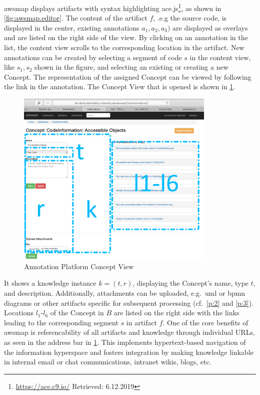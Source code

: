 \gls{awsmap} displays artifacts with syntax highlighting ace.js\footnote{\url{https://ace.c9.io/} Retrieved: 6.12.2019}, as shown in \cref{fig:awsmap.editor}.
The content of the artifact \(f\), .e.g the source code, is displayed in the center,
existing annotations \(a_1, a_2, a_3)\) are displayed as overlays and are listed on the right side of the view.
By clicking on an annotation in the list, the content view scrolls to the corresponding location in the artifact.
New annotations can be created by selecting a segment of code \(s\) in the content view, like \(s_1, s_2\) shown in the figure, and selecting an existing or creating a new \gls{Concept}.
The representation of the assigned \gls{Concept} can be viewed by following the link in the annotation.
The Concept View that is opened is shown in \cref{fig:awsmap.concept}.
\begin{figure}[h!]
\hypertarget{fig:awsmap.concept}{%
\centering
\includegraphics[width=0.85\textwidth]{../figures/screenshots/ap-concept3.png}
\caption{Annotation Platform Concept View}\label{fig:awsmap.concept}
}
\end{figure}
It shows a knowledge instance \(k=(t,r)\), displaying the \gls{Concept}'s name, type \(t\), and description.
Additionally, attachments can be uploaded, e.g.~\gls{uml} or \gls{bpmn} diagrams or other \glspl{artifact} specific for subsequent processing (cf.~\cref{p:2} and \cref{p:3}).
Locations \(l_1\)-\(l_6\) of the \gls{Concept} in \(B\) are listed on the right side with the links leading to the corresponding segment \(s\) in \gls{artifact} \(f\).
%
%
One of the core benefits of \gls{awsmap} is referencability of all \glspl{artifact} and knowledge through individual URLs, as seen in the address bar in \cref{fig:awsmap.concept}.
This implements hypertext-based navigation of the  information hyperspace and fosters integration by making knowledge linkable in internal email or chat communications, intranet wikis, blogs, etc.

